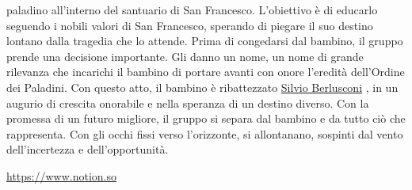 paladino all'interno del santuario di San Francesco. L'obiettivo è di
educarlo seguendo i nobili valori di San Francesco, sperando di piegare
il suo destino lontano dalla tragedia che lo attende. Prima di
congedarsi dal bambino, il gruppo prende una decisione importante. Gli
danno un nome, un nome di grande rilevanza che incarichi il bambino di
portare avanti con onore l'eredità dell'Ordine dei Paladini. Con questo
atto, il bambino è ribattezzato
\href{Silvio\%20Berlusconi\%2051c2a61cf7214d26a74744d6ab46e241.md}{Silvio
Berlusconi} , in un augurio di crescita onorabile e nella speranza di un
destino diverso. Con la promessa di un futuro migliore, il gruppo si
separa dal bambino e da tutto ciò che rappresenta. Con gli occhi fissi
verso l'orizzonte, si allontanano, sospinti dal vento dell'incertezza e
dell'opportunità.

\url{https://www.notion.so}
